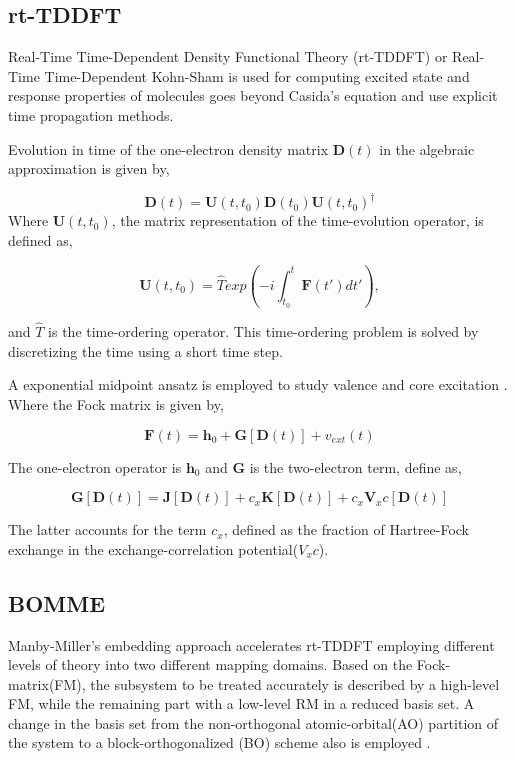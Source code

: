 \documentclass[notitlepage,12pt]{report}
\begin{document}
\subsection{rt-TDDFT}
Real-Time Time-Dependent Density Functional Theory (rt-TDDFT) or Real-Time Time-Dependent Kohn-Sham is used for computing excited state and response properties of molecules goes beyond Casida's equation \supercite{casida1995recent} and use explicit time propagation methods\supercite{goings2018real}.

Evolution in time of the one-electron density matrix $\textbf{D}(t)$ in the algebraic approximation is given by,

\begin{equation}
	\textbf{D}(t) = \textbf{U}(t,t_0)\textbf{D}(t_0)\textbf{U}(t,t_0)^{\dagger}
\end{equation}
Where $\textbf{U}(t,t_0)$, the matrix representation of the time-evolution operator, is defined as,

\begin{equation}
	\textbf{U}(t,t_0)= \hat{T} exp \left( -i \int_{t_0}^{t} \textbf{F}(t')dt' \right),
\end{equation}

and $\hat{T}$ is the time-ordering operator. This time-ordering problem is solved by discretizing the time using a short time step\supercite{de2020pyberthart}. 

A exponential midpoint ansatz is employed to study valence and core excitation \supercite{de2021environment}. Where the Fock matrix is given by,

\begin{equation}
	\textbf{F}(t)=\textbf{h}_0+\textbf{G}[\textbf{D}(t)]+v_{ext}(t)
\end{equation}

The one-electron operator is $\textbf{h}_0$ and $\textbf{G}$ is the two-electron term,  define as,

\begin{equation}
	\textbf{G}[\textbf{D}(t)] = \textbf{J}[\textbf{D}(t)]+c_x\textbf{K}[\textbf{D}(t)]+c_x\textbf{V}_xc[\textbf{D}(t)]
\end{equation}

The latter accounts for the term $c_x$, defined as the fraction of Hartree-Fock exchange in the exchange-correlation potential($V_xc$).

\subsection{BOMME}
Manby-Miller’s embedding approach accelerates rt-TDDFT employing different levels of theory into two different mapping domains. Based on the Fock-matrix(FM), the subsystem to be treated accurately is described by a high-level FM, while the remaining part with a low-level RM in a reduced basis set. A change in the basis set from the non-orthogonal atomic-orbital(AO) partition of the system to a block-orthogonalized (BO) scheme also is employed \supercite{ding2017embedded}. 
\end{document}
